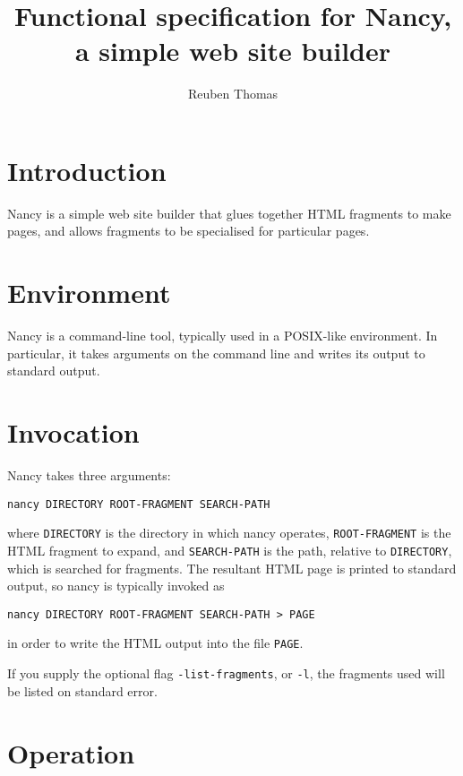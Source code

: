 \documentclass[english]{scrartcl}
\begin{document}
\title{Functional specification for Nancy, a simple web site builder}
\date{\relax}
\author{Reuben Thomas}
\maketitle

\section{Introduction}

Nancy is a simple web site builder that glues together HTML fragments
to make pages, and allows fragments to be specialised for particular
pages.

\section{Environment}

Nancy is a command-line tool, typically used in a POSIX-like
environment. In particular, it takes arguments on the command line and
writes its output to standard output.

\section{Invocation}

Nancy takes three arguments:

\begin{verbatim}
nancy DIRECTORY ROOT-FRAGMENT SEARCH-PATH
\end{verbatim}

where \texttt{DIRECTORY} is the directory in which nancy operates,
\texttt{ROOT-FRAGMENT} is the HTML fragment to expand, and
\texttt{SEARCH-PATH} is the path, relative to \texttt{DIRECTORY},
which is searched for fragments. The resultant HTML page is printed to
standard output, so nancy is typically invoked as

\begin{verbatim}
nancy DIRECTORY ROOT-FRAGMENT SEARCH-PATH > PAGE
\end{verbatim}

in order to write the HTML output into the file \texttt{PAGE}.

If you supply the optional flag \verb|-list-fragments|, or \verb|-l|,
the fragments used will be listed on standard error.

\section{Operation}
\label{operation}
\end{document}

